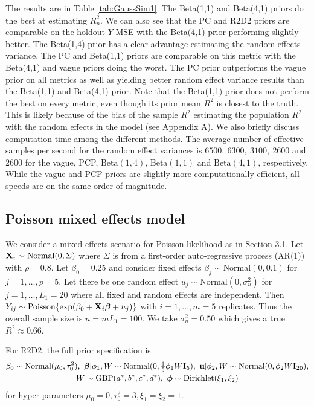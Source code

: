 \documentclass[12pt]{article}
\begin{document}
The results are in Table \ref{tab:GaussSim1}. The Beta(1,1) and Beta(4,1) priors do the best at estimating $R^2_n$. We can also see that the PC and R2D2 priors are comparable on the holdout $Y$ MSE with the Beta(4,1) prior performing slightly better. The Beta(1,4) prior has a clear advantage estimating the random effects variance. The PC and Beta(1,1) priors are comparable on this metric with the Beta(4,1) and vague priors doing the worst.  The PC prior outperforms the vague prior on all metrics as well as yielding better random effect variance results than the Beta(1,1) and Beta(4,1) prior. Note that the Beta(1,1) prior does not perform the best on every metric, even though its prior mean $R^2$ is closest to the truth. This is likely because of the bias of the sample $R^2$ estimating the population $R^2$ with the random effects in the model (see Appendix A). We also briefly discuss computation time among the different methods. The average number of effective samples per second for the random effect variances is $6500,\ 6300,\ 3100,\ 2600$ and $2600$ for the vague, PCP, $\mbox{Beta}(1,4)$, $\mbox{Beta}(1,1)$ and $\mbox{Beta}(4,1)$, respectively. While the vague and PCP priors are slightly more computationally efficient, all speeds are on the same order of magnitude.

\subsection{Poisson mixed effects model}

We consider a mixed effects scenario for Poisson likelihood as in Section 3.1. Let $\mbox{\bf X}_i\sim\mbox{Normal}(0,\Sigma)$ where $\Sigma$ is from a first-order auto-regressive process (AR(1)) with $\rho=0.8$. Let $\beta_0=0.25$ and consider fixed effects $\beta_j\sim\mbox{Normal}(0, 0.1)$ for $j=1,\dots,p=5$. Let there be one random effect $u_j\sim\mbox{Normal}(0,\sigma^2_u)$ for $j=1,\dots,L_1=20$ where all fixed and random effects are independent. Then $Y_{ij}\sim\mbox{Poisson}\{\exp(\beta_0 + \mbox{\bf X}_i\mbox{\boldmath $\beta$}+u_j)\}$ with $i=1,...,m=5$ replicates. Thus the overall sample size is $n=mL_1=100$. We take $\sigma^2_u=0.50$ which gives a true $R^2\approx 0.66$.

For R2D2, the full prior specification is
\begin{multline}
       \beta_0\sim\mbox{Normal}(\mu_0,\tau_0^2),\
       \bbeta|\phi_1,W\sim\mbox{Normal}(0, \tfrac15\phi_1W\bI_{5}),\
       {\bf u}|\phi_2,W\sim\mbox{Normal}(0,\phi_{2} W\bI_{20}),\\ W\sim\mbox{GBP}(a^*, b^*, c^*, d^*),\ \bphi\sim\mbox{Dirichlet}(\xi_1,\xi_2)
\end{multline}
for hyper-parameters $\mu_0=0,\tau^2_0=3,\xi_1=\xi_2=1$.
\end{document}
